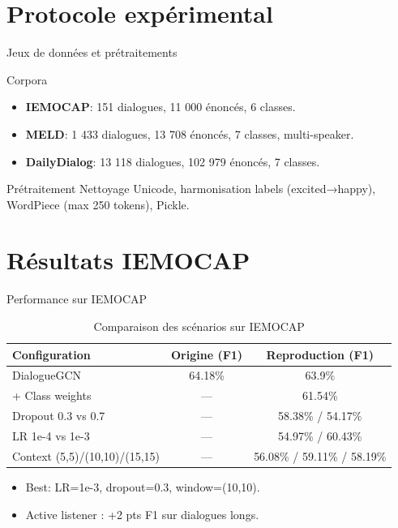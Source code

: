 \documentclass[10pt,aspectratio=169]{beamer}
\begin{document}
\section{Protocole expérimental}
\begin{frame}{Jeux de données et prétraitements}
  \begin{block}{Corpora}
    \begin{itemize}
      \item \textbf{IEMOCAP}: 151 dialogues, 11 000 énoncés, 6 classes.
      \item \textbf{MELD}: 1 433 dialogues, 13 708 énoncés, 7 classes, multi-speaker.
      \item \textbf{DailyDialog}: 13 118 dialogues, 102 979 énoncés, 7 classes.
    \end{itemize}
  \end{block}
  \vspace{0.5em}
  \begin{block}{Prétraitement}
    Nettoyage Unicode, harmonisation labels (excited→happy), WordPiece (max 250 tokens), Pickle.
  \end{block}
\end{frame}

\section{Résultats IEMOCAP}
\begin{frame}{Performance sur IEMOCAP}
  \begin{table}
    \centering
    \begin{tabular}{lcc}
      \toprule
      Configuration & Origine (F1) & Reproduction (F1) \\
      \midrule
      DialogueGCN & 64.18\% & 63.9\% \\
      + Class weights & — & 61.54\% \\
      Dropout 0.3 vs 0.7 & — & 58.38\% / 54.17\% \\
      LR 1e-4 vs 1e-3 & — & 54.97\% / 60.43\% \\
      Context (5,5)/(10,10)/(15,15) & — & 56.08\% / 59.11\% / 58.19\% \\
      \bottomrule
    \end{tabular}
    \caption{Comparaison des scénarios sur IEMOCAP}
  \end{table}
  \vfill
  \begin{itemize}
    \item Best: LR=1e-3, dropout=0.3, window=(10,10).
    \item Active listener : +2 pts F1 sur dialogues longs.
  \end{itemize}
\end{frame}
\end{document}
